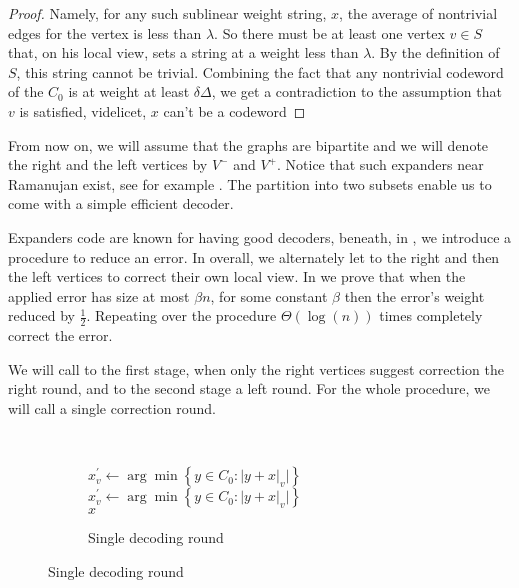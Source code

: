 \documentclass[manuscript,screen,review]{acmart}
\begin{document}
{\begin{proof}
  Namely, for any such sublinear weight string, $x$, the average of nontrivial edges for the vertex is less than $\lambda$. So there must be at least one vertex $v \in S$ that, on his local view, sets a  string at a weight less than $\lambda$. By the definition of $S$, this string cannot be trivial. Combining the fact that any nontrivial codeword of the $C_{0}$ is at weight at least $\delta\Delta$, we get a contradiction to the assumption that $v$ is satisfied, videlicet, $x$ can't be a codeword \end{proof}

  From now on, we will assume that the graphs are bipartite and we will denote the right and the left vertices by $V^{-}$ and $V^{+}$. Notice that such expanders near Ramanujan exist, see for example \cite{leverrier2022decodingquantumtannercodes}. The partition into two subsets enable us to come with a simple efficient decoder.

  Expanders code are known for having good decoders, beneath, in , we introduce a procedure to reduce an error. In overall, we alternately let to the right and then the left vertices to correct their own local view. In  we prove that when the applied error has size at most $\beta n$, for some constant $\beta$ then the error's weight reduced by $\frac{1}{2}$. Repeating over the procedure $\Theta(\log(n) )$ times completely correct the error. 

  We will call to the first stage, when only the right vertices suggest correction the right round, and to the second stage a left round. For the whole procedure, we will call a single correction round.  

  
  \begin{figure}[h]
    \begin{subfigure}[h]{0.05\textwidth}
      \
    \end{subfigure}
    \begin{subfigure}[h]{0.40\textwidth}

    \label{alg:three}
      \begin{algorithm}[H]
    \caption{Single decoding round}
    \For { $ v \in V^{+}$} {
      $x^{\prime}_{v} \leftarrow \arg\min {\left\{  y \in C_{0} : |y + x|_{v} |  \right\} } $\\
    }
     {
      $x^{\prime}_{v} \leftarrow \arg\min {\left\{  y \in C_{0} : |y + x|_{v} |  \right\} } $\\
    }
    \Return  $x $


\end{algorithm}
\end{subfigure}
\end{figure}}
\end{document}

